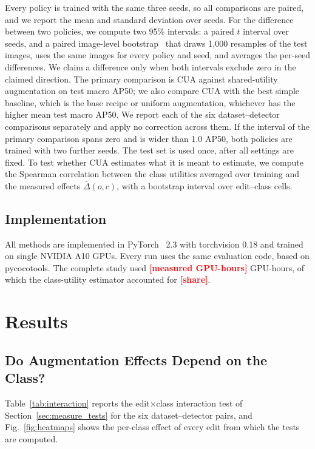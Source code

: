 \documentclass[conference]{IEEEtran}
\newcommand{\todo}[1]{\textcolor{red}{\textbf{[#1]}}}
\begin{document}
Every policy is trained with the same three seeds, so all comparisons are paired, and we report the mean and standard deviation over seeds. For the difference between two policies, we compute two 95\% intervals: a paired $t$ interval over seeds, and a paired image-level bootstrap~\cite{efron1979} that draws 1,000 resamples of the test images, uses the same images for every policy and seed, and averages the per-seed differences. We claim a difference only when both intervals exclude zero in the claimed direction. The primary comparison is CUA against shared-utility augmentation on test macro AP50; we also compare CUA with the best simple baseline, which is the base recipe or uniform augmentation, whichever has the higher mean test macro AP50. We report each of the six dataset--detector comparisons separately and apply no correction across them. If the interval of the primary comparison spans zero and is wider than 1.0 AP50, both policies are trained with two further seeds. The test set is used once, after all settings are fixed. To test whether CUA estimates what it is meant to estimate, we compute the Spearman correlation between the class utilities averaged over training and the measured effects $\bar\Delta(o,c)$, with a bootstrap interval over edit--class cells.

\subsection{Implementation}
\label{sec:setup_impl}

All methods are implemented in PyTorch~\cite{paszke2019pytorch} 2.3 with torchvision 0.18 and trained on single NVIDIA A10 GPUs. Every run uses the same evaluation code, based on pycocotools. The complete study used \todo{measured GPU-hours} GPU-hours, of which the class-utility estimator accounted for \todo{share}.


\section{Results}
\label{sec:results}

\subsection{Do Augmentation Effects Depend on the Class?}
\label{sec:results_measurement}

Table~\ref{tab:interaction} reports the edit$\times$class interaction test of Section~\ref{sec:measure_tests} for the six dataset--detector pairs, and Fig.~\ref{fig:heatmaps} shows the per-class effect of every edit from which the tests are computed.
\end{document}

